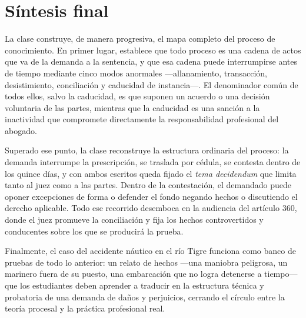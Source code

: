 \documentclass[12pt,oneside]{book}
\begin{document}
\chapter*{Síntesis final}

La clase construye, de manera progresiva, el mapa completo del proceso de conocimiento. En primer lugar, establece que todo proceso es una cadena de actos que va de la demanda a la sentencia, y que esa cadena puede interrumpirse antes de tiempo mediante cinco modos anormales ---allanamiento, transacción, desistimiento, conciliación y caducidad de instancia---. El denominador común de todos ellos, salvo la caducidad, es que suponen un acuerdo o una decisión voluntaria de las partes, mientras que la caducidad es una sanción a la inactividad que compromete directamente la responsabilidad profesional del abogado.

Superado ese punto, la clase reconstruye la estructura ordinaria del proceso: la demanda interrumpe la prescripción, se traslada por cédula, se contesta dentro de los quince días, y con ambos escritos queda fijado el \textit{tema decidendum} que limita tanto al juez como a las partes. Dentro de la contestación, el demandado puede oponer excepciones de forma o defender el fondo negando hechos o discutiendo el derecho aplicable. Todo ese recorrido desemboca en la audiencia del artículo 360, donde el juez promueve la conciliación y fija los hechos controvertidos y conducentes sobre los que se producirá la prueba.

Finalmente, el caso del accidente náutico en el río Tigre funciona como banco de pruebas de todo lo anterior: un relato de hechos ---una maniobra peligrosa, un marinero fuera de su puesto, una embarcación que no logra detenerse a tiempo--- que los estudiantes deben aprender a traducir en la estructura técnica y probatoria de una demanda de daños y perjuicios, cerrando el círculo entre la teoría procesal y la práctica profesional real.
\end{document}
